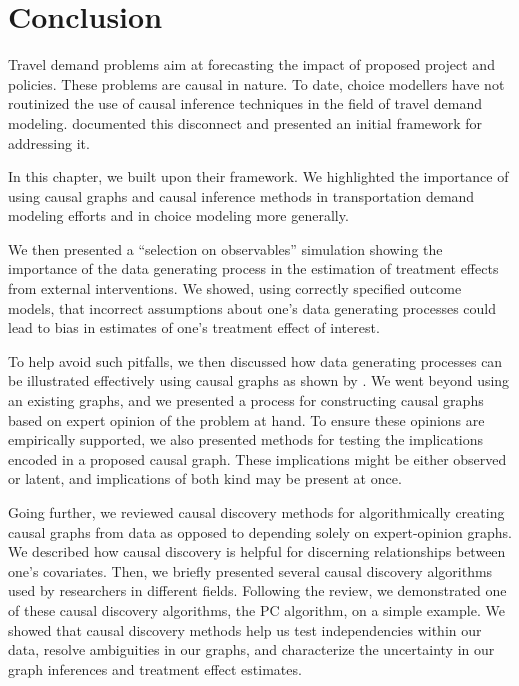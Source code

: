 \section{Conclusion}
\label{sec:conclusion}

Travel demand problems aim at forecasting the impact of proposed project and policies.
These problems are causal in nature.
To date, choice modellers have not routinized the use of causal inference techniques in the field of travel demand modeling.
\citet{brathwaite_2018_causal} documented this disconnect and presented an initial framework for addressing it.

In this chapter, we built upon their framework.
We highlighted the importance of using causal graphs and causal inference methods in transportation demand modeling efforts and in choice modeling more generally.

We then presented a ``selection on observables'' simulation showing the importance of the data generating process in the estimation of treatment effects from external interventions.
We showed, using correctly specified outcome models, that incorrect assumptions about one's data generating processes could lead to bias in estimates of one's treatment effect of interest.

To help avoid such pitfalls, we then discussed how data generating processes can be illustrated effectively using causal graphs as shown by \citet{pearl_1995_causal}.
We went beyond using an existing graphs, and we presented a process for constructing causal graphs based on expert opinion of the problem at hand.
To ensure these opinions are empirically supported, we also presented methods for testing the implications encoded in a proposed causal graph.
These implications might be either observed or latent, and implications of both kind may be present at once.

Going further, we reviewed causal discovery methods for algorithmically creating causal graphs from data as opposed to depending solely on expert-opinion graphs.
We described how causal discovery is helpful for discerning relationships between one's covariates.
Then, we briefly presented several causal discovery algorithms used by researchers in different fields.
Following the review, we demonstrated one of these causal discovery algorithms, the PC algorithm, on a simple example.
We showed that causal discovery methods help us test independencies within our data,
resolve ambiguities in our graphs,
and characterize the uncertainty in our graph inferences and treatment effect estimates.

